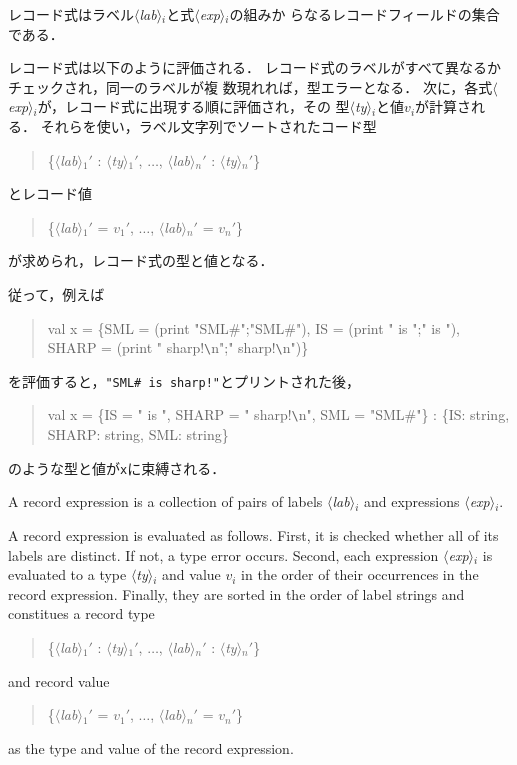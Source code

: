 \documentclass{jbook}
\newcommand{\code}[1]{\mbox{\large\tt #1}}
\newcommand{\nonterm}[1]{\mbox{$\langle$}{\it #1}\mbox{$\rangle$}}
\newenvironment{program}{\begin{quote}\begin{tt}}%
                        {\end{tt}\end{quote}}
\begin{document}
	レコード式はラベル\nonterm{lab}$_i$と式\nonterm{exp}$_i$の組みか
らなるレコードフィールドの集合である．

	レコード式は以下のように評価される．
	レコード式のラベルがすべて異なるかチェックされ，同一のラベルが複
数現れれば，型エラーとなる．
	次に，各式\nonterm{exp}$_i$が，レコード式に出現する順に評価され，その
型\nonterm{ty}$_i$と値$v_i$が計算される．
	それらを使い，ラベル文字列でソートされたコード型
\begin{program}
\{\nonterm{lab}$_1'$ : \nonterm{ty}$_1'$, $\ldots$, \nonterm{lab}$_n'$ : \nonterm{ty}$_n'$\}
\end{program}
とレコード値
\begin{program}
\{\nonterm{lab}$_1'$ = $v_1'$, $\ldots$, \nonterm{lab}$_n'$ = $v_n'$\}
\end{program}
が求められ，レコード式の型と値となる．

	従って，例えば
\begin{program}
val x = \{SML = (print "SML\#";"SML\#"), 
          IS = (print " is ";" is "),
          SHARP = (print " sharp!\verb|\|n";" sharp!\verb|\|n")\}
\end{program}
を評価すると，\code{"SML\# is sharp!"}とプリントされた後，
\begin{program}
val x = \{IS = " is ", SHARP = " sharp!\verb|\|n", SML = "SML\#"\} : \{IS: string, SHARP: string, SML: string\}
\end{program}
のような型と値が\code{x}に束縛される．

\else%
	A record expression is a collection of pairs of labels
\nonterm{lab}$_i$ and expressions \nonterm{exp}$_i$.

	A record expression is evaluated as follows.
	First, it is checked whether all of its labels are distinct.
	If not, a type error occurs.
	Second,
each expression \nonterm{exp}$_i$ is evaluated to a
type \nonterm{ty}$_i$ and value $v_i$ in
the order of their occurrences in the record expression.
	Finally, they are sorted in the order of label strings and
constitues a record type
\begin{program}
\{\nonterm{lab}$_1'$ : \nonterm{ty}$_1'$, $\ldots$, \nonterm{lab}$_n'$ : \nonterm{ty}$_n'$\}
\end{program}
and record value
\begin{program}
\{\nonterm{lab}$_1'$ = $v_1'$, $\ldots$, \nonterm{lab}$_n'$ = $v_n'$\}
\end{program}
as the type and value of the record expression.
\end{document}
